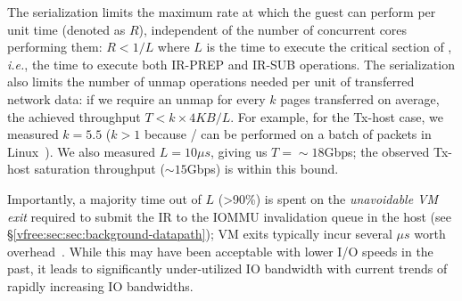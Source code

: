 The serialization limits the maximum rate at which the guest can perform  
  per unit time (denoted as $R$), independent of the number of concurrent cores performing them: 
  $R < 1/L$ where $L$ is the time to execute the critical section of , \textit{i.e.}, the time 
    to execute both IR-PREP and IR-SUB operations. 
The serialization also limits the number of unmap operations 
  needed per unit of transferred network data: if we require an unmap for every $k$ pages transferred on average, 
  the achieved throughput $T < k \times 4KB / L$. For example, for the Tx-host case, 
  we measured $k = 5.5$ ($k>1$ because / can be performed on 
  a batch of packets in Linux~\cite{Rubin2024FastSafe}). 
  We also measured {$L = 10{\mu}s$}, giving us $T = {\sim}18$Gbps; 
  the observed Tx-host saturation throughput (${\sim}15$Gbps) is within this bound. 

Importantly, a majority time out of $L$ (>90\%) is spent on the {\it unavoidable VM exit} 
  required to submit the IR to the IOMMU invalidation queue in the host (see \S\ref{vfree:sec:sec:background-datapath}); 
VM exits typically incur several ${\mu}s$ worth overhead~\cite{vmexit1,vmexit2}. 
While this may have been acceptable with lower I/O speeds in the past, 
  it leads to significantly under-utilized IO bandwidth with 
  current trends of rapidly increasing IO bandwidths.  
\fi 





